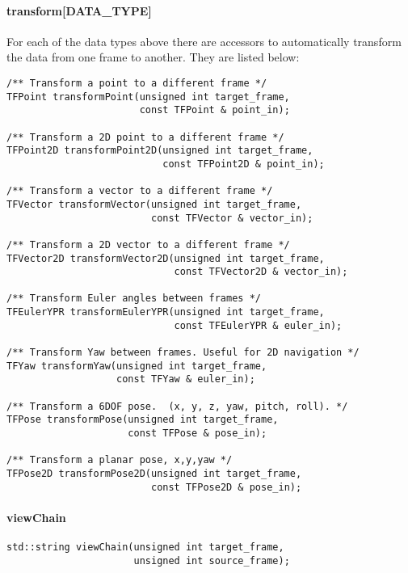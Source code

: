 \documentclass[12pt]{article}
\begin{document}
\paragraph{transform[DATA\_TYPE]}
For each of the data types above there are accessors to automatically
transform the data from one frame to another. They are listed below:
\begin{verbatim}
/** Transform a point to a different frame */
TFPoint transformPoint(unsigned int target_frame, 
                       const TFPoint & point_in);

/** Transform a 2D point to a different frame */
TFPoint2D transformPoint2D(unsigned int target_frame, 
                           const TFPoint2D & point_in);

/** Transform a vector to a different frame */
TFVector transformVector(unsigned int target_frame, 
                         const TFVector & vector_in);

/** Transform a 2D vector to a different frame */
TFVector2D transformVector2D(unsigned int target_frame, 
                             const TFVector2D & vector_in);

/** Transform Euler angles between frames */
TFEulerYPR transformEulerYPR(unsigned int target_frame, 
                             const TFEulerYPR & euler_in);

/** Transform Yaw between frames. Useful for 2D navigation */
TFYaw transformYaw(unsigned int target_frame, 
                   const TFYaw & euler_in);

/** Transform a 6DOF pose.  (x, y, z, yaw, pitch, roll). */
TFPose transformPose(unsigned int target_frame, 
                     const TFPose & pose_in);

/** Transform a planar pose, x,y,yaw */
TFPose2D transformPose2D(unsigned int target_frame, 
                         const TFPose2D & pose_in);
\end{verbatim}

\paragraph{viewChain}
\begin{verbatim}
std::string viewChain(unsigned int target_frame, 
                      unsigned int source_frame);
\end{verbatim}
\end{document}
